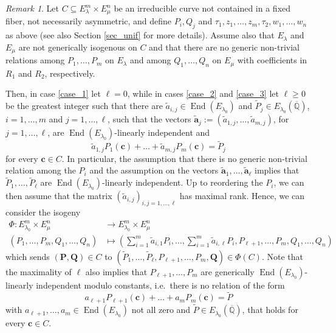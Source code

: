 \documentclass[11pt,a4paper,reqno]{amsart}
\numberwithin{equation}{section}
\newcommand{\Qal}{\overline{\mathbb{Q}}}
\newcommand{\cc}{\mathbf{c}}
\renewcommand{\l}{\lambda}
\newcommand{\m}{\mu}
\newcommand{\pt}[1]{\left( #1 \right)}
\DeclareMathOperator{\en}{End}
\theoremstyle{remark}
\newtheorem{remark}[theorem]{Remark}
\theoremstyle{definition}
\theoremstyle{definition}
\begin{document}
\begin{remark}\label{rmk:pti_const}
Let $C \subseteq E_{\l}^m \times E_{\m}^n$ be an irreducible curve not contained in a fixed fiber, not necessarily asymmetric, and define $P_i, Q_j$ and $\tau_1, z_1, \ldots, z_m, \tau_2, w_1, \ldots, w_n$ as above (see also Section \ref{sec_unif} for more details).
Assume also that $E_{\l}$ and $E_{\m}$ are not generically isogenous on $C$ and that there are no generic non-trivial relations among $P_1, \ldots, P_m$ on $E_{\l}$ and among $Q_1, \ldots, Q_n$ on $E_{\m}$ with coefficients in $R_1$ and $R_2$, respectively.

Then, in case \ref{case_1} let $\ell=0$, while in cases \ref{case_2} and \ref{case_3} let $\ell \geq 0$ be the greatest integer such that there are $\widetilde{a}_{i,j} \in \en(E_{\l_0})$ and $\widetilde{P}_j \in E_{\l_0}(\Qal)$, $i=1, \ldots, m$ and $j=1, \ldots, \ell$, such that the vectors $\widetilde{\mathbf{a}}_{j}:=(\widetilde{a}_{1,j}, \ldots, \widetilde{a}_{m,j})$, for $j=1, \ldots, \ell$, are $\en(E_{\l_0})$-linearly independent and
$$\widetilde{a}_{1,j} P_1(\cc) + \ldots + \widetilde{a}_{m,j} P_m(\cc)=\widetilde{P}_j$$
for every $\cc \in C$.
In particular, the assumption that there is no generic non-trivial relation among the $P_i$ and the assumption on the vectors $\widetilde{\mathbf{a}}_{1}, \ldots, \widetilde{\mathbf{a}}_{\ell}$ implies that $\widetilde{P}_1, \ldots, \widetilde{P}_{\ell}$ are $\en(E_{\l_0})$-linearly independent.
Up to reordering the $P_i$, we can then assume that the matrix $(\widetilde{a}_{i,j})_{i,j=1, \ldots, \ell}$ has maximal rank. 
Hence, we can consider the isogeny
\begin{align*}
\Phi: E_{\l_0}^m \times E_{\m}^n &\longrightarrow E_{\l_0}^m \times E_{\m}^n\\
(P_1, \ldots, P_m, Q_1, \ldots, Q_n) &\longmapsto \pt{\sum\limits_{i=1}^m \widetilde{a}_{i,1}P_i, \ldots, \sum\limits_{i=1}^m \widetilde{a}_{i,\ell}P_i, P_{\ell+1}, \ldots, P_m, Q_1, \ldots, Q_n}
\end{align*}
which sends $(\mathbf{P}, \mathbf{Q}) \in C$ to $(\widetilde{P}_1, \ldots, \widetilde{P}_{\ell}, P_{\ell+1}, \ldots, P_m, \mathbf{Q}) \in \Phi(C)$. Note that the maximality of $\ell$ also implies that $P_{\ell+1}, \ldots, P_m$ are generically $\en(E_{\l_0})$-linearly independent modulo constants, i.e.\ there is no relation of the form 
$$a_{\ell+1} P_{\ell+1}(\cc) + \ldots + a_m P_m(\cc) = \widetilde{P}$$
with $a_{\ell+1}, \ldots, a_m \in \en(E_{\l_0})$ not all zero and $\widetilde{P} \in E_{\l_0}(\Qal)$, that holds for every $\cc \in C$.


\end{remark}
\end{document}
